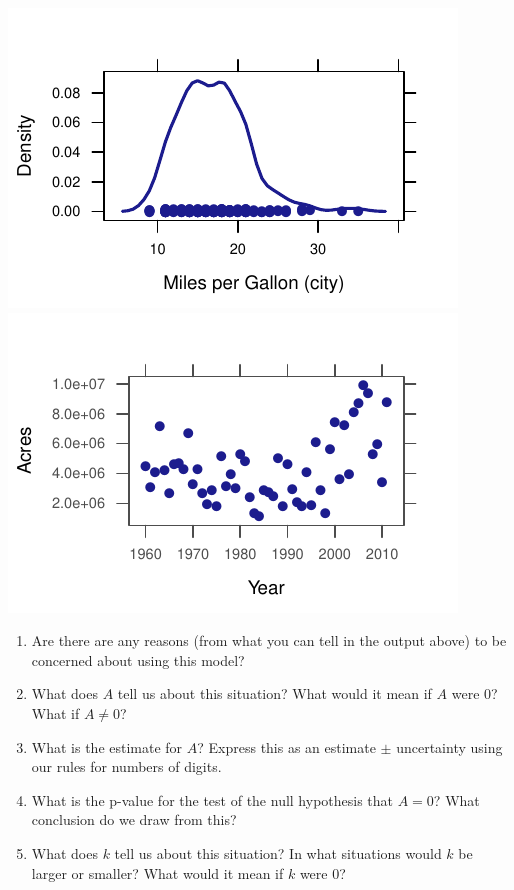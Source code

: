 \documentclass[twoside]{book}
\makeatletter
\def\maxwidth{ %
  \ifdim\Gin@nat@width>\linewidth
    \linewidth
  \else
    \Gin@nat@width
  \fi
}
\newenvironment{knitrout}{}{} %
\makeatother
\begin{document}
\begin{problem}
\begin{knitrout}
{\centering \includegraphics[width=\maxwidth]{figures/fig-unnamed-chunk-26-1} 
\includegraphics[width=\maxwidth]{figures/fig-unnamed-chunk-26-2} 

}



\end{knitrout}
\begin{enumerate}
	\item
		Are there are any reasons (from what you can tell in the output
		above) to be concerned about using this model?
	\item
		What does $A$ tell us about this situation?  
		What would it mean if $A$ were 0?  What if $A \neq 0$?
\item
	What is the estimate for $A$?  Express this as an estimate $\pm$ uncertainty
	using our rules for numbers of digits.
\item
	What is the p-value for the test of the null hypothesis that $A=0$?
	What conclusion do we draw from this?
\item
	What does $k$ tell us about this situation?  In what situations would $k$
	be larger or smaller?  What would it mean if $k$ were 0?


\end{enumerate}
\end{problem}
\end{document}
